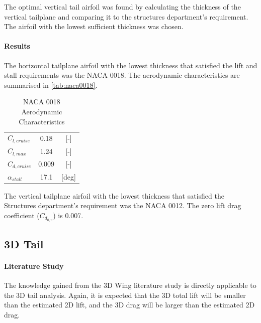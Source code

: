 The optimal vertical tail airfoil was found by calculating the thickness of the vertical tailplane and comparing it to the structures department's requirement. The airfoil with the lowest sufficient thickness was chosen.

\paragraph{Results} The horizontal tailplane airfoil with the lowest thickness that satisfied the lift and stall requirements was the NACA 0018. The aerodynamic characteristics are summarised in \autoref{tab:naca0018}.

\begin{table}[H]
\centering
\caption{NACA 0018 Aerodynamic Characteristics}
\label{tab:naca0018}
\begin{tabular}{lcc}
\toprule
\textbf{$C_{l,cruise}$}  & 0.18 & [-] \\ \hdashline
\textbf{$C_{l,max}$}     & 1.24 & [-] \\ \hdashline
\textbf{$C_{d,cruise}$}  & 0.009 & [-] \\ \hdashline
\textbf{$\alpha_{stall}$} & 17.1 & [deg] \\ \bottomrule
\end{tabular}
\end{table}

The vertical tailplane airfoil with the lowest thickness that satisfied the Structures department's requirement was the NACA 0012. The zero lift drag coefficient ($C_{d_{0,v}}$) is 0.007.


\subsection*{3D Tail}

\paragraph{Literature Study} The knowledge gained from the 3D Wing literature study is directly applicable to the 3D tail analysis. Again, it is expected that the 3D total lift will be smaller than the estimated 2D lift, and the 3D drag will be larger than the estimated 2D drag.

